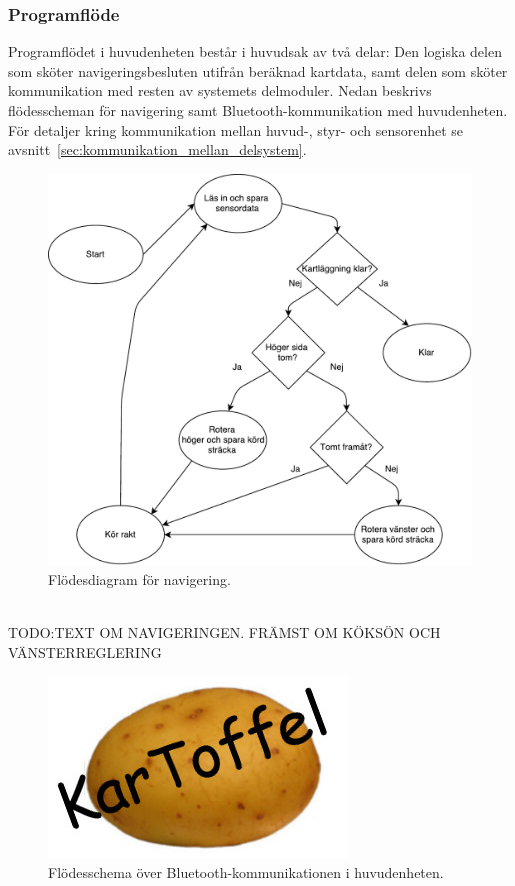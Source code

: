 \documentclass{article}
\begin{document}
\subsubsection{Programflöde}
Programflödet i huvudenheten består i huvudsak av två delar: Den logiska delen som sköter navigeringsbesluten utifrån beräknad kartdata, samt delen som sköter kommunikation med resten av systemets delmoduler. Nedan beskrivs flödesscheman för navigering samt Bluetooth-kommunikation med huvudenheten. För detaljer kring kommunikation mellan huvud-, styr- och sensorenhet se avsnitt~\ref{sec:kommunikation_mellan_delsystem}. 
\begin{figure}[H]
\centering
\includegraphics[scale=0.6]{navigering_flowchart}
\caption{Flödesdiagram för navigering.}
\label{fig:navigering_flowchart}
\end{figure}
\ \\

TODO:TEXT OM NAVIGERINGEN. FRÄMST OM KÖKSÖN OCH VÄNSTERREGLERING

\begin{figure}[H]
\centering
\includegraphics[scale=0.45]{Logo}
\caption{Flödesschema över Bluetooth-kommunikationen i huvudenheten.}
\label{fig:Kommunikation_huvudenhet_v2}
\end{figure}
\ \\
\end{document}

